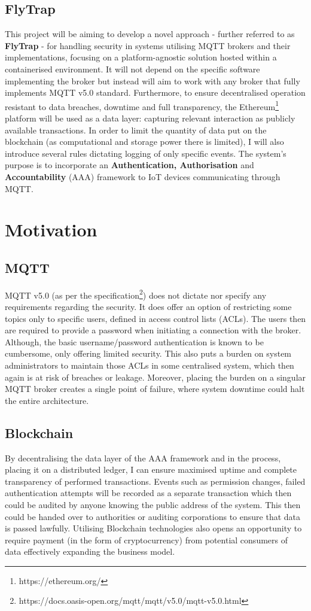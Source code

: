 \subsection{FlyTrap}
This project will be aiming to develop a novel approach - further referred to as \textbf{FlyTrap} - for handling security in systems utilising MQTT brokers and their implementations, focusing on a platform-agnostic solution hosted within a containerised environment. It will not depend on the specific software implementing the broker but instead will aim to work with any broker that fully implements MQTT v5.0 standard. Furthermore, to ensure decentralised operation resistant to data breaches, downtime and full transparency, the Ethereum\footnote{https://ethereum.org/} platform will be used as a data layer: capturing relevant interaction as publicly available transactions. In order to limit the quantity of data put on the blockchain (as computational and storage power there is limited), I will also introduce several rules dictating logging of only specific events. The system's purpose is to incorporate an \textbf{Authentication, Authorisation} and \textbf{Accountability} (AAA) framework to IoT devices communicating through MQTT.

\section{Motivation}

\subsection{MQTT}
MQTT v5.0 (as per the specification\footnote{https://docs.oasis-open.org/mqtt/mqtt/v5.0/mqtt-v5.0.html}) does not dictate nor specify any requirements regarding the security. It does offer an option of restricting some topics only to specific users, defined in access control lists (ACLs). The users then are required to provide a password when initiating a connection with the broker. Although, the basic username/password authentication is known to be cumbersome, only offering limited security. This also puts a burden on system administrators to maintain those ACLs in some centralised system, which then again is at risk of breaches or leakage. Moreover, placing the burden on a singular MQTT broker creates a single point of failure, where system downtime could halt the entire architecture.
\subsection{Blockchain}
By decentralising the data layer of the AAA framework and in the process, placing it on a distributed ledger, I can ensure maximised uptime and complete transparency of performed transactions. Events such as permission changes, failed authentication attempts will be recorded as a separate transaction which then could be audited by anyone knowing the public address of the system. This then could be handed over to authorities or auditing corporations to ensure that data is passed lawfully. Utilising Blockchain technologies also opens an opportunity to require payment (in the form of cryptocurrency) from potential consumers of data effectively expanding the business model. 
